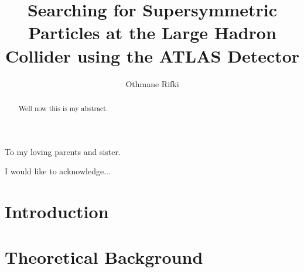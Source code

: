 \documentclass{outhesis}
\begin{document}
\author{Othmane Rifki}
\title{Searching for Supersymmetric Particles at the Large Hadron Collider using the ATLAS Detector}
\address{Norman, Oklahoma}

\begin{dedication}
  To my loving parents and sister.
\end{dedication}

\begin{acknowledgements}
  I would like to acknowledge...
\end{acknowledgements}


\begin{abstract}
Well now this is my abstract.
\end{abstract}


\frontmatter

\maketitle

\mainmatter


\chapter*{Introduction}\label{sec:intro}


\chapter{Theoretical Background}\label{sec:theory}

\end{document}
